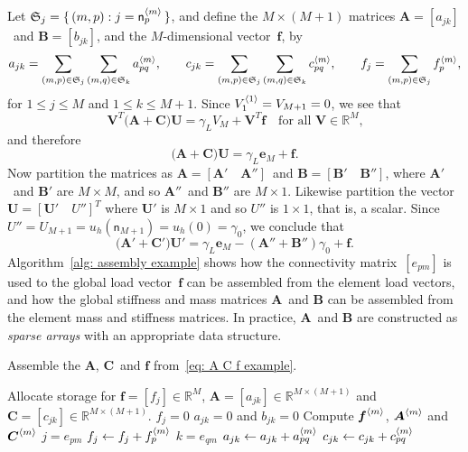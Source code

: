 Let $\mathfrak{S}_j=\{\,(m,p):j=\mathsf{n}^{\langle m\rangle}_p\,\}$, and
define the $M\times(M+1)$ matrices $\boldsymbol{A}=[a_{jk}]$~and 
$\boldsymbol{B}=[b_{jk}]$, and the $M$-dimensional vector~$\boldsymbol{f}$, by
\[
a_{jk}=\sum_{(m,p)\in\mathfrak{S}_j}
    \sum_{(m,q)\in\mathfrak{S}_k}a^{\langle m\rangle}_{pq},\qquad
c_{jk}=\sum_{(m,p)\in\mathfrak{S}_j}
    \sum_{(m,q)\in\mathfrak{S}_k}c^{\langle m\rangle}_{pq},\qquad
f_j=\sum_{(m,p)\in\mathfrak{S}_j}f^{\langle m\rangle}_p,
\]
for $1\le j\le M$ and $1\le k\le M+1$.  Since $V^{\langle1\rangle}_1=V_{M+1}=0$, we see
that
\[
\boldsymbol{V}^T\bigl(\boldsymbol{A}+\boldsymbol{C}\bigr)\boldsymbol{U}
    =\gamma_LV_M+\boldsymbol{V}^T\boldsymbol{f}
    \quad\text{for all $\boldsymbol{V}\in\mathbb{R}^M$,}
\]
and therefore
\begin{equation}\label{eq: A C f example}
\bigl(\boldsymbol{A}+\boldsymbol{C}\bigr)\boldsymbol{U}
    =\gamma_L\boldsymbol{e}_M+\boldsymbol{f}.
\end{equation}
Now partition the matrices as 
$\boldsymbol{A}=[\boldsymbol{A}'\quad\boldsymbol{A}'']$~and
$\boldsymbol{B}=[\boldsymbol{B}'\quad\boldsymbol{B}'']$, where 
$\boldsymbol{A}'$~and $\boldsymbol{B}'$ are $M\times M$, and so
$\boldsymbol{A}''$~and $\boldsymbol{B}''$ are $M\times1$.  Likewise partition 
the vector~$\boldsymbol{U}=[\boldsymbol{U}'\quad U'']^T$ where 
$\boldsymbol{U}'$ is $M\times1$ and so $U''$ is $1\times1$, that is, a scalar.  
Since $U''=U_{M+1}=u_h(\mathsf{n}_{M+1})=u_h(0)=\gamma_0$, we conclude that
\[
\bigl(\boldsymbol{A}'+\boldsymbol{C}'\bigr)\boldsymbol{U}'
=\gamma_L\boldsymbol{e}_M-(\boldsymbol{A}''+\boldsymbol{B}'')\gamma_0
    +\boldsymbol{f}.
\]
Algorithm~\ref{alg: assembly example} shows how the connectivity 
matrix~$[e_{pm}]$ is used to the global load 
vector~$\boldsymbol{f}$ can be assembled from the element load vectors, and 
how the global stiffness and mass matrices $\boldsymbol{A}$~and $\boldsymbol{B}$ 
can be assembled from the element mass and stiffness matrices.  In practice,
$\boldsymbol{A}$~and $\boldsymbol{B}$ are constructed as \emph{sparse arrays}
with an appropriate data structure.

\begin{algorithm}
\caption{Assemble the $\boldsymbol{A}$, $\boldsymbol{C}$~and $\boldsymbol{f}$
from~\eqref{eq: A C f example}.}
\label{alg: assembly example}
\begin{algorithmic}
\State Allocate storage for $\boldsymbol{f}=[f_j]\in\mathbb{R}^M$,
$\boldsymbol{A}=[a_{jk}]\in\mathbb{R}^{M\times(M+1)}$ and
$\boldsymbol{C}=[c_{jk}]\in\mathbb{R}^{M\times(M+1)}$.
    \State $f_j=0$
        \State $a_{jk}=0$ and $b_{jk}=0$
    \EndFor
\EndFor
{}
    \State Compute $\boldsymbol{f}^{\langle m\rangle}$, $\boldsymbol{A}^{\langle m\rangle}$ and
           $\boldsymbol{C}^{\langle m\rangle}$
        \State $j=e_{pm}$
            \State $f_j\gets f_j+f^{\langle m\rangle}_p$
        \EndIf
            \State $k=e_{qm}$
            \State $a_{jk}\gets a_{jk}+a^{\langle m\rangle}_{pq}$
            \State $c_{jk}\gets c_{jk}+c^{\langle m\rangle}_{pq}$
        \EndFor
    \EndFor
\EndFor
\end{algorithmic}
\end{algorithm}

